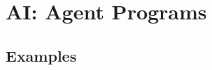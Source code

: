 \chapter{AI: Agent Programs}




\clearpage




\clearpage
\section{Examples}




























